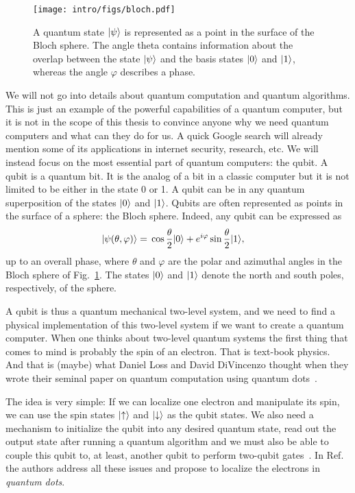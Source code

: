 \begin{figure}
  \centering
  \texttt{[image: intro/figs/bloch.pdf]}
  \caption{ A quantum state $|{\psi}\rangle$ is represented as a point in the surface of the Bloch sphere. The angle theta contains information about the overlap between the state $|{\psi}\rangle$ and the basis states $|{0}\rangle$ and $|{1}\rangle$, whereas the angle $\varphi$ describes a phase. \label{fig1:bloch}}
\end{figure}

We will not go into details about quantum computation and quantum algorithms.
%
This is just an example of the powerful capabilities of a quantum computer, but it is not in the scope of this thesis to convince anyone why we need quantum computers and what can they do for us. A quick Google search will already mention some of its applications in internet security, research, etc.
%
We will instead focus on the most essential part of quantum computers: the qubit. A qubit is a quantum bit. It is the analog of a bit in a classic computer but it is not limited to be either in the state 0 or 1. A qubit can be in any quantum superposition of the states $|{0}\rangle$ and $|{1}\rangle$. Qubits are often represented as points in the surface of a sphere: the Bloch sphere. Indeed, any qubit can be expressed as
\begin{align}
|{\psi (\theta,\varphi)}\rangle  = {}&{} \cos\frac{\theta}{2}|{0}\rangle + e^{i\varphi} \sin\frac{\theta}{2}|{1}\rangle,
\end{align}
up to an overall phase,
where $\theta$ and $\varphi$ are the polar and azimuthal angles in the Bloch sphere of Fig.~\ref{fig1:bloch}. The states $|{0}\rangle$ and $|{1}\rangle$ denote the north and south poles, respectively, of the sphere.





A qubit is thus a quantum mechanical two-level system, and we need to find a physical implementation of this two-level system if we want to create a quantum computer. When one thinks about two-level quantum systems the first thing that comes to mind is probably the spin of an electron. That is text-book physics. And that is (maybe) what Daniel Loss and David DiVincenzo thought when they wrote their seminal paper on quantum computation using quantum dots~\cite{Loss1998}.


The idea is very simple: If we can localize one electron and manipulate its spin, we can use the spin states $|{\uparrow}\rangle$ and $|{\downarrow}\rangle$ as the qubit states. We also need a mechanism to initialize the qubit into any desired quantum state, read out the output state after running a quantum algorithm and we must also be able to couple this qubit to, at least, another qubit to perform two-qubit gates~\cite{DiVincenzo2000a,Nielsen2010}. In Ref.~\cite{Loss1998} the authors address all these issues and propose to localize the electrons in \textit{quantum dots}.



